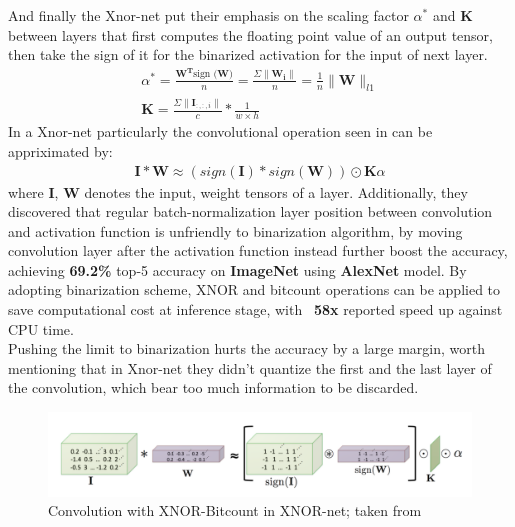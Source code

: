 And finally the Xnor-net put their emphasis on the scaling factor $\alpha^*$ and $\boldsymbol{K}$ between layers that first computes the floating point value of an output tensor, then take the sign of it for the binarized activation for the input of next layer.
\begin{equation}
    \begin{aligned}\label{eq:xnornet}
        \alpha^*=\frac{\boldsymbol{W^T}\text{sign ($\boldsymbol{W}$)}}{n}=\frac{\Sigma\|\boldsymbol{W_i}\|}{n}=\frac{1}{n}\|\boldsymbol{W}\|_{l1} \\
        \boldsymbol{K}=\frac{\Sigma\|\boldsymbol{I}_{:,:,i}\|}{c} * \frac{1}{w \times h}
    \end{aligned}
\end{equation}
In a Xnor-net particularly the convolutional operation seen in  can be appriximated by:
\begin{equation}
    \begin{aligned}\label{eq:xnorop}
        \boldsymbol{I}*\boldsymbol{W}\approx(sign(\boldsymbol{I}) * sign(\boldsymbol{W}))\odot\boldsymbol{K}\alpha
    \end{aligned}
\end{equation}
where $\boldsymbol{I}$, $\boldsymbol{W}$ denotes the input, weight tensors of a layer. Additionally, they discovered that regular batch-normalization layer position between convolution and activation function is unfriendly to binarization algorithm, by moving convolution layer after the activation function instead further boost the accuracy, achieving \textbf{69.2\%} top-5 accuracy on \textbf{ImageNet} using \textbf{AlexNet} model. By adopting binarization scheme, XNOR and bitcount operations can be applied to save computational cost at inference stage, with ~\textbf{58x} reported speed up against CPU time. \\
Pushing the limit to binarization hurts the accuracy by a large margin, worth mentioning that in Xnor-net they didn't quantize the first and the last layer of the convolution, which bear too much information to be discarded.
\begin{figure}
    \centering
    \includegraphics[width=0.8\linewidth]{inc/2_related_work/figure/xnor_operation.png}
    \caption{Convolution with XNOR-Bitcount in XNOR-net; taken from \cite{XnorNet}}
    \label{fig:xnor_operation}
\end{figure}
 
